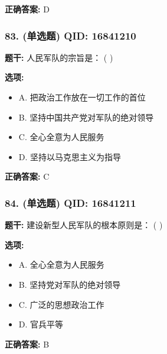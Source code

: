 \documentclass[12pt,UTF8]{ctexart}
\begin{document}
\textbf{正确答案:}
D

\vspace{0.3em}\hrulefill\vspace{0.7em}

\subsubsection*{83. (单选题) \small QID: 16841210}

\textbf{题干:}
人民军队的宗旨是： ( )

\textbf{选项:}
\begin{itemize}[leftmargin=*]

  \item A. 把政治工作放在一切工作的首位

  \item B. 坚持中国共产党对军队的绝对领导

  \item C. 全心全意为人民服务

  \item D. 坚持以马克思主义为指导

\end{itemize}

\textbf{正确答案:}
C

\vspace{0.3em}\hrulefill\vspace{0.7em}

\subsubsection*{84. (单选题) \small QID: 16841211}

\textbf{题干:}
建设新型人民军队的根本原则是： ( )

\textbf{选项:}
\begin{itemize}[leftmargin=*]

  \item A. 全心全意为人民服务

  \item B. 坚持党对军队的绝对领导

  \item C. 广泛的思想政治工作

  \item D. 官兵平等

\end{itemize}

\textbf{正确答案:}
B

\vspace{0.3em}\hrulefill\vspace{0.7em}
\end{document}

